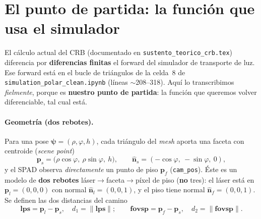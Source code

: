 \documentclass[11pt,a4paper]{article}
\theoremstyle{plain}
\theoremstyle{definition}
\newcommand{\vect}[1]{\boldsymbol{#1}}
\newcommand{\norm}[1]{\left\lVert #1 \right\rVert}
\begin{document}
\section{El punto de partida: la funci\'on que usa el simulador}
\label{sec:partida}

El c\'alculo actual del CRB (documentado en \texttt{sustento\_teorico\_crb.tex})
diferencia por \textbf{diferencias finitas} el forward del simulador de
transporte de luz. Ese forward est\'a en el bucle de tri\'angulos de la celda~8
de \texttt{simulation\_polar\_clean.ipynb} (l\'ineas $\sim$208--318). Aqu\'i lo
transcribimos \emph{fielmente}, porque es \textbf{nuestro punto de partida}: la
funci\'on que queremos volver diferenciable, tal cual est\'a.

\paragraph{Geometr\'ia (dos rebotes).}
Para una pose $\vect{\psi}=(\rho,\varphi,h)$, cada tri\'angulo del \emph{mesh}
aporta una faceta con centroide (\emph{scene point})
\begin{equation}
    \vect{p}_s=\bigl(\rho\cos\varphi,\ \rho\sin\varphi,\ h\bigr),
    \qquad
    \hat{\vect n}_s=(-\cos\varphi,\ -\sin\varphi,\ 0),
    \label{eq:pose}
\end{equation}
y el SPAD observa \emph{directamente} un punto de piso $\vect{p}_f$
(\texttt{cam\_pos}). \'Este es un modelo de \textbf{dos rebotes}
l\'aser$\to$faceta$\to$p\'ixel de piso (\textbf{no} tres): el l\'aser est\'a en
$\vect{p}_l=(0,0,0)$ con normal $\hat{\vect n}_l=(0,0,1)$, y el piso tiene normal
$\hat{\vect n}_f=(0,0,1)$. Se definen las dos distancias del camino
\begin{equation}
    \vect{lps}=\vect{p}_l-\vect{p}_s,\quad d_1=\norm{\vect{lps}};
    \qquad
    \vect{fovsp}=\vect{p}_f-\vect{p}_s,\quad d_2=\norm{\vect{fovsp}}.
    \label{eq:dist}
\end{equation}
\end{document}
